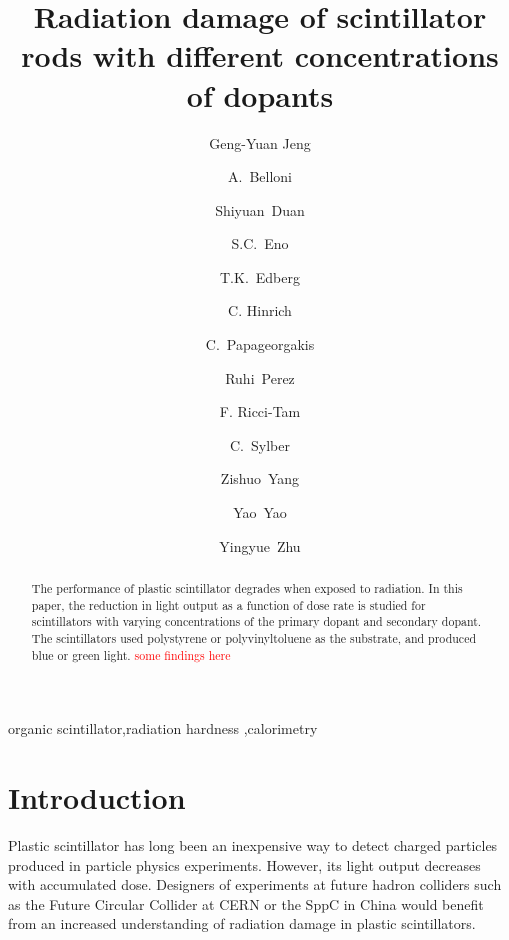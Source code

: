 \documentclass[review]{elsarticle}
\begin{document}
\begin{frontmatter}

\title{Radiation damage of scintillator rods with different concentrations of dopants
}


\author[umd]{Geng-Yuan Jeng}
\author[umd]{A.~Belloni}
\author[umd]{Shiyuan~Duan}
\author[umd]{S.C.~Eno}
\author[umd]{T.K.~Edberg}
\author[umd]{C. Hinrich}
\author[umd]{C.~Papageorgakis}
\author[umd]{Ruhi~Perez}
\author[umd]{F. Ricci-Tam}
\author[umd]{C.~Sylber}
\author[umd]{Zishuo~Yang}
\author[umd]{Yao~Yao}
\author[umd]{Yingyue~Zhu}

\address[umd]{Dept. Physics, U. Maryland, College Park MD 30742 USA}



\begin{abstract}
The performance of plastic scintillator degrades when exposed to radiation. 
In this paper, the reduction in light output  as a function of dose rate
is studied for scintillators
with varying concentrations of the primary dopant and secondary dopant.
The scintillators used polystyrene or polyvinyltoluene as the substrate, and
produced blue or green light. \textcolor{red}{some findings here}
\end{abstract}

\begin{keyword}
organic scintillator\sep radiation hardness \sep calorimetry
\end{keyword}

\end{frontmatter}

\linenumbers

\section{Introduction}
Plastic scintillator has long been an inexpensive way to detect 
charged particles produced in particle physics experiments.  
However, its 
light output decreases with accumulated dose.  
Designers of experiments at future hadron colliders such as the Future Circular Collider at CERN\cite{fcc}
or the SppC in China\cite{sppc} would benefit from an increased understanding
of radiation damage in plastic scintillators.
\end{document}
